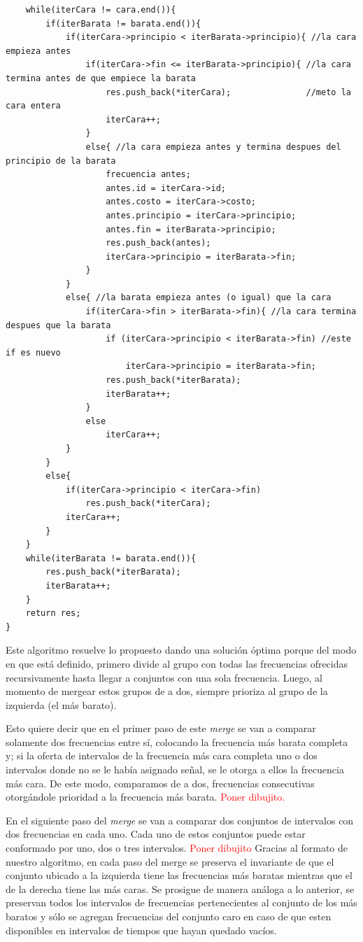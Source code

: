 \documentclass[a4paper]{article}
\begin{document}
\begin{codesnippet}
\begin{verbatim}
	while(iterCara != cara.end()){
		if(iterBarata != barata.end()){
			if(iterCara->principio < iterBarata->principio){ //la cara empieza antes
				if(iterCara->fin <= iterBarata->principio){ //la cara termina antes de que empiece la barata
					res.push_back(*iterCara);				//meto la cara entera
					iterCara++;
				}
				else{ //la cara empieza antes y termina despues del principio de la barata
					frecuencia antes;
					antes.id = iterCara->id;
					antes.costo = iterCara->costo;
					antes.principio = iterCara->principio;
					antes.fin = iterBarata->principio;
					res.push_back(antes);
					iterCara->principio = iterBarata->fin;
				}
			}
			else{ //la barata empieza antes (o igual) que la cara
				if(iterCara->fin > iterBarata->fin){ //la cara termina despues que la barata
					if (iterCara->principio < iterBarata->fin) //este if es nuevo
						iterCara->principio = iterBarata->fin;
					res.push_back(*iterBarata);
					iterBarata++;
				}
				else
					iterCara++;
			}
		}
		else{
			if(iterCara->principio < iterCara->fin)
				res.push_back(*iterCara);
			iterCara++;
		}
	}
	while(iterBarata != barata.end()){
		res.push_back(*iterBarata);
		iterBarata++;
	}
	return res;
}

	\end{verbatim}
	\end{codesnippet}






Este algoritmo resuelve lo propuesto dando una soluci\'on \'optima porque del modo en que est\'a definido, primero divide al grupo con todas las frecuencias ofrecidas recursivamente hasta llegar a conjuntos con una sola frecuencia. Luego, al momento de mergear estos grupos de a dos, siempre prioriza al grupo de la izquierda (el m\'as barato). 

Esto quiere decir que en el primer paso de este \textit{merge} se van a comparar solamente dos frecuencias entre s\'i, colocando la frecuencia m\'as barata completa y; si la oferta de intervalos de la frecuencia m\'as cara completa uno o dos intervalos donde no se le hab\'ia asignado se\~nal, se le otorga a ellos la frecuencia m\'as cara. De este modo, comparamos de a dos, frecuencias consecutivas otorg\'andole prioridad a la frecuencia m\'as barata. \textcolor{red}{Poner dibujito.} 

En el siguiente paso del \textit{merge} se van a comparar dos conjuntos de intervalos con dos frecuencias en cada uno. Cada uno de estos conjuntos puede estar conformado por uno, dos o tres intervalos. \textcolor{red}{Poner dibujito} Gracias al formato de nuestro algoritmo, en cada paso del merge se preserva el invariante de que el conjunto ubicado a la izquierda tiene las frecuencias m\'as baratas mientras que el de la derecha tiene las m\'as caras. Se prosigue de manera an\'aloga a lo anterior, se preservan todos los intervalos de frecuencias pertenecientes al conjunto de los m\'as baratos y s\'olo se agregan frecuencias del conjunto caro en caso de que esten disponibles en intervalos de tiempos que hayan quedado vac\'ios.
\end{document}
